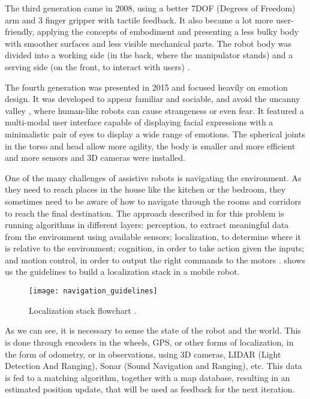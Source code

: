 The third generation came in 2008, using a better 7DOF (Degrees of Freedom) arm and 3 finger gripper with tactile feedback. It also became a lot more user-friendly, applying the concepts of embodiment and presenting a less bulky body with smoother surfaces and less visible mechanical parts. The robot body was divided into a working side (in the back, where the manipulator stands) and a serving side (on the front, to interact with users) \cite{graf2009robotic}.

The fourth generation was presented in 2015 and focused heavily on emotion design. It was developed to appear familiar and sociable, and avoid the uncanny valley \cite{mori2012uncanny}, where human-like robots can cause strangeness or even fear. It featured a multi-modal user interface capable of displaying facial expressions with a minimalistic pair of eyes to display a wide range of emotions. The spherical joints in the torso and head allow more agility, the body is smaller and more efficient and more sensors and 3D cameras were installed.

One of the many challenges of assistive robots is navigating the environment. As they need to reach places in the house like the kitchen or the bedroom, they sometimes need to be aware of how to navigate through the rooms and corridors to reach the final destination. The approach described in \citeauthor{siegwart2011introduction} for this problem is running algorithms in different layers: perception, to extract meaningful data from the environment using available sensors; localization, to determine where it is relative to the environment; cognition, in order to take action given the inputs; and motion control, in order to output the right commands to the motors \cite{siegwart2011introduction}.  shows us the guidelines to build a localization stack in a mobile robot.

\begin{figure}[!ht]
    \centering
    \texttt{[image: navigation\_guidelines]}
    \caption[Localization stack flowchart.]{Localization stack flowchart \cite{siegwart2011introduction}.}
    \label{fig:navigation_guidelines}
\end{figure}

As we can see, it is necessary to sense the state of the robot and the world. This is done through encoders in the wheels, GPS, or other forms of localization, in the form of odometry, or in observations, using 3D cameras, LIDAR (Light Detection And Ranging), Sonar (Sound Navigation and Ranging), etc. This data is fed to a matching algorithm, together with a map database, resulting in an estimated position update, that will be used as feedback for the next iteration.

